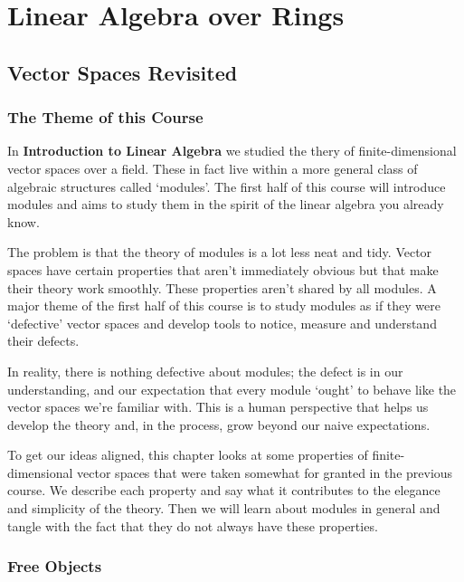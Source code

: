 \documentclass[oneside,english]{amsbook}
\numberwithin{section}{chapter}
\theoremstyle{plain}
\theoremstyle{definition}
\begin{document}
	\part{Linear Algebra over Rings}
	
	\chapter{Vector Spaces Revisited}
	
		\section{The Theme of this Course}
		
			In \textbf{Introduction to Linear Algebra} we studied the thery of finite-dimensional vector spaces over a field. These in fact live within a more general class of algebraic structures called `modules'. The first half of this course will introduce modules and aims to study them in the spirit of the linear algebra you already know.
			
			The problem is that the theory of modules is a lot less neat and tidy. Vector spaces have certain properties that aren't immediately obvious but that make their theory work smoothly. These properties aren't shared by all modules. A major theme of the first half of this course is to study modules as if they were `defective' vector spaces and develop tools to notice, measure and understand their defects.
			
			In reality, there is nothing defective about modules; the defect is in our understanding, and our expectation that every module `ought' to behave like the vector spaces we're familiar with. This is a human perspective that helps us develop the theory and, in the process, grow beyond our naive expectations. 
			
			To get our ideas aligned, this chapter looks at some properties of finite-dimensional vector spaces that were taken somewhat for granted in the previous course. We describe each property and say what it contributes to the elegance and simplicity of the theory. Then we will learn about modules in general and tangle with the fact that they do not always have these properties.
			
		\section{Free Objects}
\end{document}
